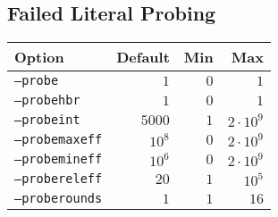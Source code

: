 \documentclass{article}
\begin{document}
\subsection{Failed Literal Probing}
\begin{tabular}{l|rrr}
    Option & Default & Min & Max \\
    \hline
    \texttt{--probe}        & $1$    & $0$  & $1$ \\
    \texttt{--probehbr}     & $1$    & $0$  & $1$ \\
    \texttt{--probeint}     & $5000$ & $1$  & $2 \cdot 10^9$ \\
    \texttt{--probemaxeff}  & $10^8$ & $0$  & $2 \cdot 10^9$ \\
    \texttt{--probemineff}  & $10^6$ & $0$  & $2 \cdot 10^9$ \\
    \texttt{--probereleff}  & $20$   & $1$  & $10^5$ \\
    \texttt{--proberounds}  & $1$    & $1$  & $16$ \\
\end{tabular}
\end{document}
